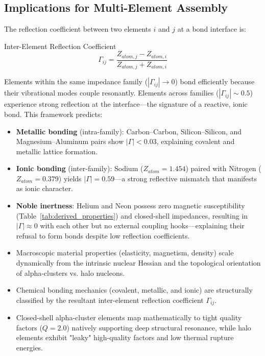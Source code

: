 \subsection{Implications for Multi-Element Assembly}

The reflection coefficient between two elements $i$ and $j$ at a bond interface is:
\begin{resultbox}{Inter-Element Reflection Coefficient}
\begin{equation}
    \Gamma_{ij} = \frac{Z_{atom,j} - Z_{atom,i}}{Z_{atom,j} + Z_{atom,i}}
    \label{eq:gamma_inter}
\end{equation}
\end{resultbox}

Elements within the same impedance family ($|\Gamma_{ij}| \to 0$) bond efficiently because their vibrational modes couple resonantly. Elements across families ($|\Gamma_{ij}| \sim 0.5$) experience strong reflection at the interface---the signature of a reactive, ionic bond. This framework predicts:
\begin{itemize}
    \item \textbf{Metallic bonding} (intra-family): Carbon--Carbon, Silicon--Silicon, and Magnesium--Aluminum pairs show $|\Gamma| < 0.03$, explaining covalent and metallic lattice formation.
    \item \textbf{Ionic bonding} (inter-family): Sodium ($Z_{atom} = 1.454$) paired with Nitrogen ($Z_{atom} = 0.379$) yields $|\Gamma| = 0.59$---a strong reflective mismatch that manifests as ionic character.
    \item \textbf{Noble inertness}: Helium and Neon possess zero magnetic susceptibility (Table~\ref{tab:derived_properties}) and closed-shell impedances, resulting in $|\Gamma| \approx 0$ with each other but no external coupling hooks---explaining their refusal to form bonds despite low reflection coefficients.
\end{itemize}

\begin{summarybox}
\begin{itemize}
    \item Macroscopic material properties (elasticity, magnetism, density) scale dynamically from the intrinsic nuclear Hessian and the topological orientation of alpha-clusters vs. halo nucleons.
    \item Chemical bonding mechanics (covalent, metallic, and ionic) are structurally classified by the resultant inter-element reflection coefficient $\Gamma_{ij}$.
    \item Closed-shell alpha-cluster elements map mathematically to tight quality factors ($Q=2.0$) natively supporting deep structural resonance, while halo elements exhibit "leaky" high-quality factors and low thermal rupture energies.
\end{itemize}
\end{summarybox}

